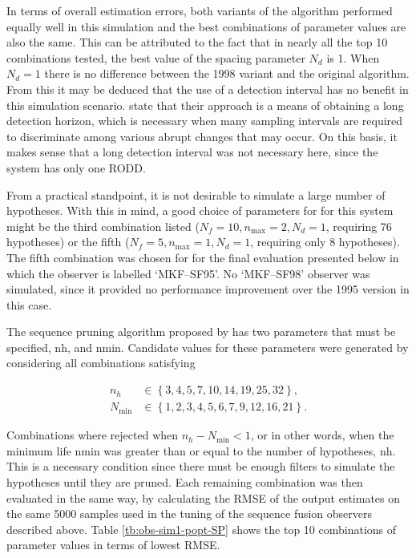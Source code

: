 In terms of overall estimation errors, both variants of the algorithm performed equally well in this simulation and the best combinations of parameter values are also the same. This can be attributed to the fact that in nearly all the top 10 combinations tested, the best value of the spacing parameter $N_d$ is 1. When $N_d=1$ there is no difference between the 1998 variant and the original algorithm. From this it may be deduced that the use of a detection interval has no benefit in this simulation scenario. \cite{robertson_method_1998} state that their approach is a means of obtaining a long detection horizon, which is necessary when many sampling intervals are required to discriminate among various abrupt changes that may occur. On this basis, it makes sense that a long detection interval was not necessary here, since the system has only one RODD.

From a practical standpoint, it is not desirable to simulate a large number of hypotheses. With this in mind, a good choice of parameters for for this system might be the third combination listed ($N_f=10,n_\text{max}=2,N_d=1$, requiring 76 hypotheses) or the fifth ($N_f=5,n_\text{max}=1,N_d=1$, requiring only 8 hypotheses). The fifth combination was chosen for for the final evaluation presented below in which the observer is labelled `MKF--SF95'. No `MKF--SF98' observer was simulated, since it provided no performance improvement over the 1995 version in this case.

The sequence pruning algorithm proposed by \cite{eriksson_classification_1996} has two parameters that must be specified, \gls{nh}, and \gls{nmin}. Candidate values for these parameters were generated by considering all combinations satisfying

\begin{equation} \label{eq:sim-sys-siso-MKF-SP-param-values}
	\begin{aligned}
		n_h &\in \left\{3, 4, 5, 7, 10, 14, 19, 25, 32\right\},  \\
			N_\text{min} &\in \left\{1, 2, 3, 4, 5, 6, 7, 9, 12, 16, 21\right\}.
		\end{aligned}
	\end{equation}

Combinations where rejected when $n_h - N_\text{min} < 1$, or in other words, when the minimum life \gls{nmin} was greater than or equal to the number of hypotheses, \gls{nh}. This is a necessary condition since there must be enough filters to simulate the hypotheses until they are pruned. Each remaining combination was then evaluated in the same way, by calculating the \gls{RMSE} of the output estimates on the same 5000 samples used in the tuning of the sequence fusion observers described above. Table \ref{tb:obs-sim1-popt-SP} shows the top 10 combinations of parameter values in terms of lowest \gls{RMSE}.

